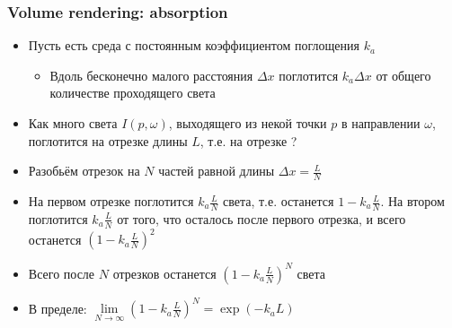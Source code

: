 \documentclass{beamer}
\begin{document}
\begin{frame}[fragile]
\frametitle{Volume rendering: absorption}
\begin{itemize}
\item Пусть есть среда с постоянным коэффициентом поглощения \begin{math}k_a\end{math}
\pause
\begin{itemize}
\item Вдоль бесконечно малого расстояния \begin{math}\Delta x\end{math} поглотится \begin{math}k_a \Delta x\end{math} от общего количестве проходящего света
\end{itemize}
\pause
\item Как много света \begin{math}I(p,\omega)\end{math}, выходящего из некой точки \begin{math}p\end{math} в направлении \begin{math}\omega\end{math}, поглотится на отрезке длины \begin{math}L\end{math}, т.е. на отрезке \begin{math}[p, p + L\omega]\end{math}?
\pause
\item Разобьём отрезок на \begin{math}N\end{math} частей равной длины \begin{math}\Delta x = \frac{L}{N}\end{math}
\pause
\item На первом отрезке поглотится \begin{math}k_a \frac{L}{N}\end{math} света, т.е. останется \begin{math}1 - k_a\frac{L}{N}\end{math}. На втором поглотится \begin{math}k_a \frac{L}{N}\end{math} от того, что осталось после первого отрезка, и всего останется \begin{math}\left(1 - k_a\frac{L}{N}\right)^2\end{math}
\pause
\item Всего после \begin{math}N\end{math} отрезков останется \begin{math}\left(1 - k_a\frac{L}{N}\right)^N\end{math} света
\pause
\item В пределе: \begin{math}\lim\limits_{N \rightarrow \infty} \left(1 - k_a\frac{L}{N}\right)^N = \exp(- k_a L)\end{math}
\end{itemize}
\end{frame}
\end{document}
